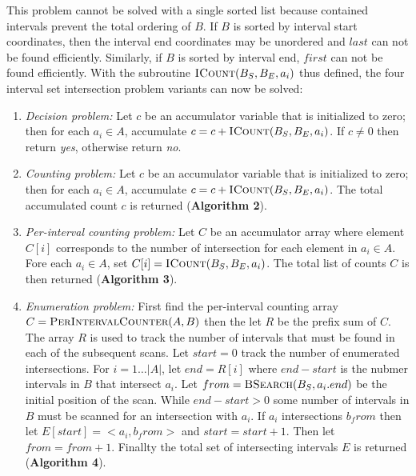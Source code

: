 \documentclass{bioinfo}
\begin{document}
	This problem cannot be solved with a single sorted list because
	contained intervals prevent the total ordering of $B$.  If $B$ is
	sorted by interval start coordinates, then the interval end
	coordinates may be unordered and $last$ can not be found
	efficiently.  Similarly, if $B$ is sorted by interval end,
	$first$ can not be found efficiently.  With the subroutine
	$\textsc{ICount}(B_S,B_E,a_i)$ thus defined, the four interval set intersection
	problem variants can now be solved:

	\begin{enumerate}

		\item
		{\em Decision problem:} Let $c$ be an accumulator variable that is
		initialized to zero; then for each $a_i \in A$, accumulate $c = c +
		\textsc{ICount}(B_S,B_E,a_i)$.  If $c\ne0$ then return {\em yes}, otherwise
		return {\em no}.

		\item
		{\em Counting problem:}  Let $c$ be an accumulator variable that is
		initialized to zero; then for each $a_i \in A$, accumulate $c = c +
		\textsc{ICount}(B_S,B_E,a_i)$.  The total accumulated count $c$ is 
		returned (\textbf{Algorithm 2}).

		\item
		{\em Per-interval counting problem:} Let $C$ be an accumulator
		array where element $C[i]$ corresponds to the number of
		intersection for each element in $a_i\in A$.  Fore each $a_i \in A$,
		set $C[i]=\textsc{ICount}(B_S,B_E,a_i)$.  The total list of counts $C$ is then
		returned (\textbf{Algorithm 3}).

		\item
		{\em Enumeration problem:}
		First find the per-interval counting array $C=\textsc{PerIntervalCounter}(A,B)$
		then the let $R$ be the prefix sum of $C$. The array $R$ is used to track the
		number of intervals that must be found in each of the subsequent scans.  Let
		$start = 0$ track the number of enumerated intersections.
		For $i=1\dots|A|$, let $end = R[i]$ where $end - start$ is the nubmer intervals
		in $B$ that intersect $a_i$.  Let $from=\textsc{BSearch}(B_S, a_i.end)$ be
		the initial position of the scan.  While $end - start > 0$ some number of
		intervals in $B$ must be scanned for an intersection with $a_i$.  If $a_i$
		intersections $b_from$ then let $E[start] = <a_i, b_from>$ and 
		$start=start+1$.  Then let $from = from +1$.  Finallty the total set of
		intersecting intervals $E$ is returned (\textbf{Algorithm 4}).
	\end{enumerate}
	
\end{document}
